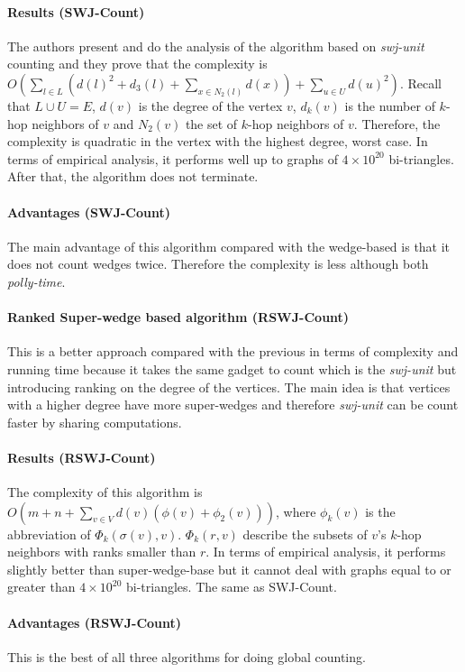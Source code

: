 \paragraph{Results (SWJ-Count)} The authors present and do the analysis of the algorithm based on \emph{swj-unit} counting and they prove that the complexity is $O(\sum_{l \in L} (d(l)^2+d_3(l) + \sum_{x \in N_2(l)} d(x)) + \sum_{u \in U} d(u)^2)$.
Recall that $L \cup U = E$, $d(v)$ is the degree of the vertex $v$, $d_k(v)$ is the number of $k$-hop neighbors of $v$ and $N_2(v)$ the set of $k$-hop neighbors of $v$.
Therefore, the complexity is quadratic in the vertex with the highest degree, worst case.
In terms of empirical analysis, it performs well up to graphs of $4 \times 10^20$ bi-triangles. After that, the algorithm does not terminate.

\paragraph{Advantages (SWJ-Count)} The main advantage of this algorithm compared with the wedge-based is that it does not count wedges twice.
Therefore the complexity is less although both \emph{polly-time}.

\paragraph{Ranked Super-wedge based algorithm (RSWJ-Count)} This is a better approach compared with the previous in terms of complexity and running time because it takes the same gadget to count which is the \emph{swj-unit} but introducing ranking on the degree of the vertices. The main idea is that vertices with a higher degree have more super-wedges 
and therefore \emph{swj-unit} can be count faster by sharing computations.

\paragraph{Results (RSWJ-Count)} The complexity of this algorithm is $O(m + n + \sum_{v \in V} d(v)(\phi(v) + \phi_2(v)))$, where $\phi_k(v)$ is the abbreviation of $\Phi_k(\sigma(v), v)$. $\Phi_k(r, v)$ describe the subsets of $v$'s $k$-hop neighbors with ranks smaller than $r$.
In terms of empirical analysis, it performs slightly better than super-wedge-base but it cannot deal with graphs equal to or greater than $4 \times 10^20$ bi-triangles. The same as SWJ-Count.

\paragraph{Advantages (RSWJ-Count)} This is the best of all three algorithms for doing global counting.

